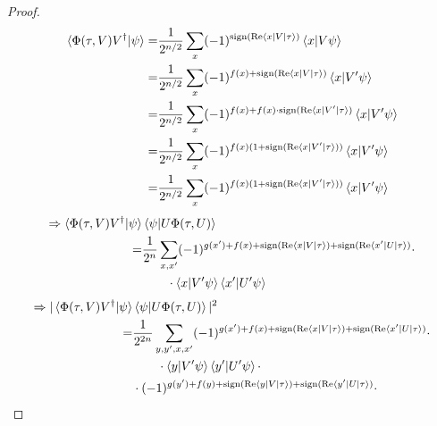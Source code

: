\documentclass[manuscript,screen,review]{acmart}
\begin{document}
\begin{proof}

  \begin{equation*}
    \begin{split}
      \braket{\Phi(\tau,V) V^{\dagger}|\psi} = & \frac{1}{2^{n/2}}\sum_{x}
      (-1)^{\operatorname{sign}( \operatorname{Re} \braket{x|V|\tau})}\braket{x |V \psi} \\
      = & \frac{1}{2^{n/2}}\sum_{x} (-1)^{ f(x) + \operatorname{sign}( \operatorname{Re}
      \braket{x|V|\tau})}\braket{x |V^{\prime} \psi} \\
      = & \frac{1}{2^{n/2}}\sum_{x} (-1)^{ f(x) +  f(x) \cdot \operatorname{sign}( \operatorname{Re}
      \braket{x|V^{\prime}|\tau})}\braket{x |V^{\prime} \psi} \\
      = & \frac{1}{2^{n/2}}\sum_{x} (-1)^{ f(x) ( 1 +  \operatorname{sign}( \operatorname{Re}
      \braket{x|V^{\prime}|\tau}))}\braket{x |V^{\prime} \psi} \\
      = & \frac{1}{2^{n/2}}\sum_{x} (-1)^{ f(x) ( 1 +  \operatorname{sign}( \operatorname{Re}
      \braket{x|V^{\prime}|\tau}))}\braket{x |V^{\prime} \psi} \\
    \end{split}
  \end{equation*}
  \begin{equation*}
    \begin{split}
      \Rightarrow  \braket{\Phi(\tau,V) V^{\dagger}|\psi} &
      \braket{\psi|U\Phi(\tau,U) }  \\
      = & \frac{1}{2^{n}}\sum_{x,x^{\prime}} (-1)^{ g(x^{\prime})+f(x) + \operatorname{sign}(
      \operatorname{Re} \braket{x|V|\tau})+\operatorname{sign}( \operatorname{Re} \braket{x^{\prime}|U|\tau})} \cdot \\
      & \ \ \ \ \ \ \cdot  \braket{x |V^{\prime} \psi}\braket{x^{\prime}
      |U^{\prime} \psi}
    \end{split}
  \end{equation*}
  \begin{equation*}
    \begin{split}
      \Rightarrow  |\braket{\Phi(\tau,V) V^{\dagger}|\psi} &
      \braket{\psi|U\Phi(\tau,U) }|^2  \\
      = & \frac{1}{2^{2n}}\sum_{y,y^{\prime},x,x^{\prime}} (-1)^{
        g(x^{\prime})+f(x) + \sign( \Rea \braket{x|V|\tau})+\sign( \Rea
      \braket{x^{\prime}|U|\tau})} \cdot \\
      & \ \ \ \ \ \ \cdot  \braket{y |V^{\prime} \psi}\braket{y^{\prime}
      |U^{\prime} \psi} \cdot  \\
      & \cdot (-1)^{ g(y^{\prime})+f(y) + \sign( \Rea \braket{y|V|\tau})+\sign(
      \Rea \braket{y^{\prime}|U|\tau})} \cdot \\

\end{split}
\end{equation*}
\end{proof}
\end{document}
